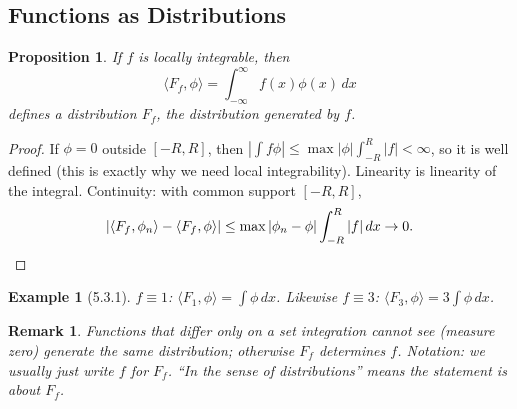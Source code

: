 \documentclass{article}
\newtheorem*{example}{Example}
\newtheorem{remark}{Remark}
\newtheorem{proposition}{Proposition}
\newcommand{\ip}[2]{\langle #1, #2 \rangle}
\begin{document}
\subsection{Functions as Distributions}
\begin{proposition}
    If $f$ is locally integrable, then
    \begin{equation}
        \ip{F_f}{\phi} = \int_{-\infty}^{\infty} f(x)\phi(x)\,dx
    \end{equation}
    defines a distribution $F_f$, the distribution \emph{generated by} $f$.
\end{proposition}
\begin{proof}
    If $\phi = 0$ outside $[-R,R]$, then $\left|\int f\phi\right| \leq \max|\phi| \int_{-R}^R |f| < \infty$, so it is well defined (this is exactly why we need local integrability). Linearity is linearity of the integral. Continuity: with common support $[-R,R]$,
    \begin{equation}
        |\ip{F_f}{\phi_n} - \ip{F_f}{\phi}| \leq \max|\phi_n - \phi| \int_{-R}^R |f|\,dx \to 0. \qedhere
    \end{equation}
\end{proof}
\begin{example}[5.3.1]
    $f \equiv 1$: $\ip{F_1}{\phi} = \int \phi\,dx$. Likewise $f \equiv 3$: $\ip{F_3}{\phi} = 3\int\phi\,dx$.
\end{example}
\begin{remark}
    Functions that differ only on a set integration cannot see (measure zero) generate the same distribution; otherwise $F_f$ determines $f$. Notation: we usually just write $f$ for $F_f$. ``In the sense of distributions'' means the statement is about $F_f$.
\end{remark}
\end{document}
